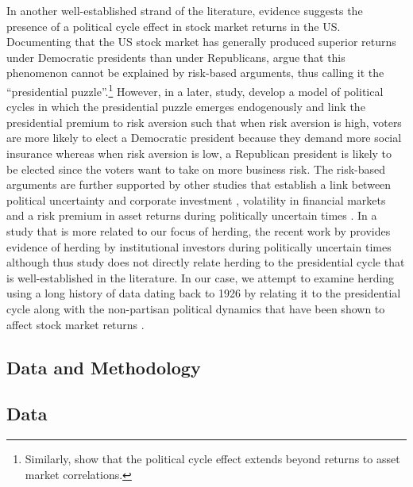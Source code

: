 \documentclass[
  letterpaper,
  DIV=11,
  numbers=noendperiod]{scrartcl}
\begin{document}
In another well-established strand of the literature, evidence suggests
the presence of a political cycle effect in stock market returns in the
US. Documenting that the US stock market has generally produced superior
returns under Democratic presidents than under Republicans,
\citet{santa2003presidential} argue that this phenomenon cannot be
explained by risk-based arguments, thus calling it the ``presidential
puzzle''.\footnote{Similarly, \citet{demirer2018presidential} show that
  the political cycle effect extends beyond returns to asset market
  correlations.} However, in a later, study, \citet{pastor2020political}
develop a model of political cycles in which the presidential puzzle
emerges endogenously and link the presidential premium to risk aversion
such that when risk aversion is high, voters are more likely to elect a
Democratic president because they demand more social insurance whereas
when risk aversion is low, a Republican president is likely to be
elected since the voters want to take on more business risk. The
risk-based arguments are further supported by other studies that
establish a link between political uncertainty and corporate investment
\citep{jens2017political}, volatility in financial markets
\citep{boutchkova2012precarious} and a risk premium in asset returns
during politically uncertain times \citep{montone2022does}. In a study
that is more related to our focus of herding, the recent work by
\citet{gavriilidis2024political} provides evidence of herding by
institutional investors during politically uncertain times although thus
study does not directly relate herding to the presidential cycle that is
well-established in the literature. In our case, we attempt to examine
herding using a long history of data dating back to 1926 by relating it
to the presidential cycle along with the non-partisan political dynamics
that have been shown to affect stock market returns
\citep[e.g.][]{montone2022does}.

\subsection{Data and Methodology}\label{data-and-methodology}

\subsection{Data}\label{data}
\end{document}
